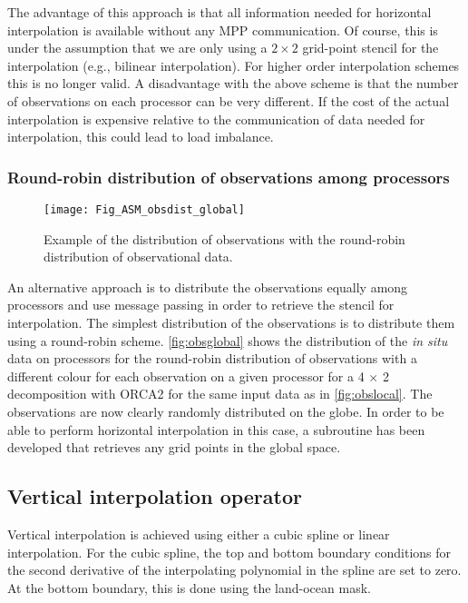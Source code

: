 \documentclass[../tex_main/NEMO_manual]{subfiles}
\begin{document}
The advantage of this approach is that all
information needed for horizontal interpolation is available without
any MPP communication. Of course, this is under the assumption that 
we are only using a $2 \times 2$ grid-point stencil for the interpolation 
(e.g., bilinear interpolation). For higher order interpolation schemes this
is no longer valid. A disadvantage with the above scheme is that the number of
observations on each processor can be very different. If the cost of
the actual interpolation is expensive relative to the communication of
data needed for interpolation, this could lead to load imbalance.

\subsubsection{Round-robin distribution of observations among processors}

\begin{figure}     \begin{center}
\texttt{[image: Fig\_ASM\_obsdist\_global]}
\caption{      \protect\label{fig:obsglobal}
Example of the distribution of observations with the round-robin distribution of observational data.}
\end{center}     \end{figure}

An alternative approach is to distribute the observations equally
among processors and use message passing in order to retrieve 
the stencil for interpolation. The simplest distribution of the observations 
is to distribute them using a round-robin scheme. \autoref{fig:obsglobal}
shows the distribution of the {\em in situ} data on processors for the
round-robin distribution of observations with a different colour for
each observation on a given processor for a 4 $\times$ 2 decomposition 
with ORCA2 for the same input data as in \autoref{fig:obslocal}.
The observations are now clearly randomly distributed on the globe.
In order to be able to perform horizontal interpolation in this case, 
a subroutine has been developed that retrieves any grid points in the 
global space.

\subsection{Vertical interpolation operator}

Vertical interpolation is achieved using either a cubic spline or
linear interpolation. For the cubic spline, the top and
bottom boundary conditions for the second derivative of the 
interpolating polynomial in the spline are set to zero.
At the bottom boundary, this is done using the land-ocean mask.
\end{document}
